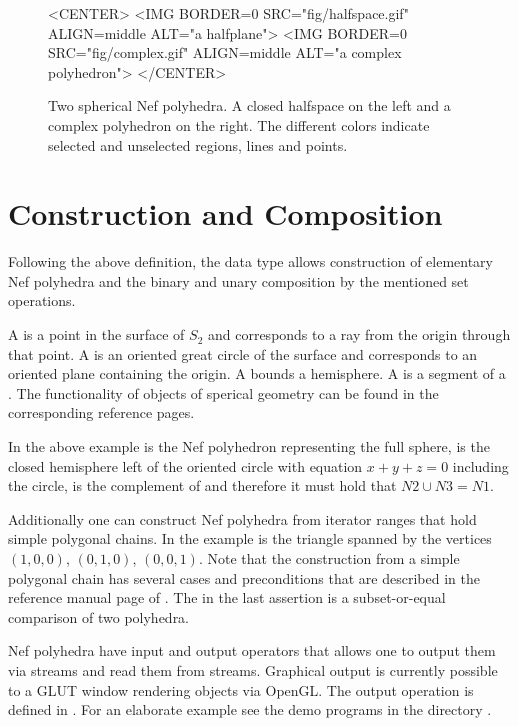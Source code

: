 \begin{figure}[htbp]
\begin{ccHtmlOnly}
<CENTER>
<IMG BORDER=0 SRC="fig/halfspace.gif" ALIGN=middle
ALT="a halfplane">
<IMG BORDER=0 SRC="fig/complex.gif" ALIGN=middle
ALT="a complex polyhedron">
</CENTER>
\end{ccHtmlOnly}
\caption{Two spherical Nef polyhedra. A closed halfspace on the left 
  and a complex polyhedron on the right. The different colors indicate
  selected and unselected regions, lines and points.}\label{nefsexamples}
\end{figure}      

\section{Construction and Composition}

Following the above definition, the data type
 allows construction of elementary Nef
polyhedra and the binary and unary composition by the mentioned set
operations.

A  is a point in the surface of $S_2$ and
corresponds to a ray from the origin through that point. A
 is an oriented great circle of the surface and
corresponds to an oriented plane containing the origin. A
 bounds a hemisphere. A  is 
a segment of a . The functionality of objects
of sperical geometry can be found in the corresponding reference
pages.


In the above example  is the Nef polyhedron representing
the full sphere,  is the closed hemisphere left of the
oriented circle with equation $x + y + z = 0$ including the circle,
 is the complement of  and therefore it must hold that
$N2 \cup N3 = N1$.

Additionally one can construct Nef polyhedra from iterator ranges that
hold simple polygonal chains. In the example  is the triangle
spanned by the vertices $(1,0,0)$, $(0,1,0)$, $(0,0,1)$.  Note that
the construction from a simple polygonal chain has several cases and
preconditions that are described in the reference manual page of
. The  in the last assertion
is a subset-or-equal comparison of two polyhedra.

Nef polyhedra have input and output operators that allows one to
output them via streams and read them from streams. Graphical output
is currently possible to a GLUT window rendering objects via OpenGL.
The output operation is defined in
. For an elaborate
example see the demo programs in the directory .

